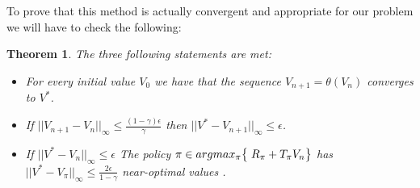 \documentclass[12pt]{article}
\newtheorem{theorem}{Theorem}[section]
\numberwithin{equation}{section}
\begin{document}
\vspace{2mm}

To prove that this method is actually convergent and appropriate for our problem we will have to check the following:

\begin{theorem}

 The three following statements are met:
    
 \begin{itemize}
     \item For every initial value $V_0$ we have that the sequence $V_{n+1}=\theta(V_n)$ converges to $V^*$.
     \item If $\lvert \lvert V_{n+1}- V_n \rvert \rvert_{\infty} \leq \frac{(1-\gamma)\epsilon}{\gamma}$ then $ \lvert \lvert  V^* - V_{n+1}  \rvert \rvert_{\infty} \leq \epsilon$.
      \item If  $ \lvert  \lvert  V^*- V_{n}  \rvert \rvert_{\infty} \leq \epsilon$ The policy $ \pi \in argmax_{\pi} \bigl\{  \hspace{1mm} R_\pi+ T_\pi V_n\bigl\} $ has $\lvert \lvert V^*-V_\pi \rvert \rvert_{\infty} \leq\frac{2\epsilon}{1-\gamma}$ near-optimal values .
 \end{itemize}
\end{theorem}
\end{document}
